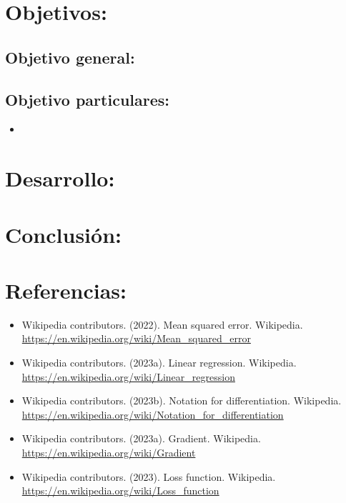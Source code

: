 \documentclass[12pt, letterpaper]{article}
\begin{document}
\section{Objetivos:}
\subsection{Objetivo general:}
\subsection{Objetivo particulares:}
\begin{itemize}
\item
\end{itemize}
\section{Desarrollo:}
\section{Conclusión:}
\section{Referencias:}
\begin{itemize}
\item Wikipedia contributors. (2022). Mean squared error. Wikipedia.
  \url{https://en.wikipedia.org/wiki/Mean_squared_error}
\item Wikipedia contributors. (2023a). Linear regression. Wikipedia.
  \url{https://en.wikipedia.org/wiki/Linear_regression}
\item Wikipedia contributors. (2023b). Notation for differentiation. Wikipedia.
  \url{https://en.wikipedia.org/wiki/Notation_for_differentiation}
\item Wikipedia contributors. (2023a). Gradient. Wikipedia. \url{https://en.wikipedia.org/wiki/Gradient}
\item Wikipedia contributors. (2023). Loss function. Wikipedia. 
	\url{https://en.wikipedia.org/wiki/Loss_function}
\end{itemize}
\end{document}
